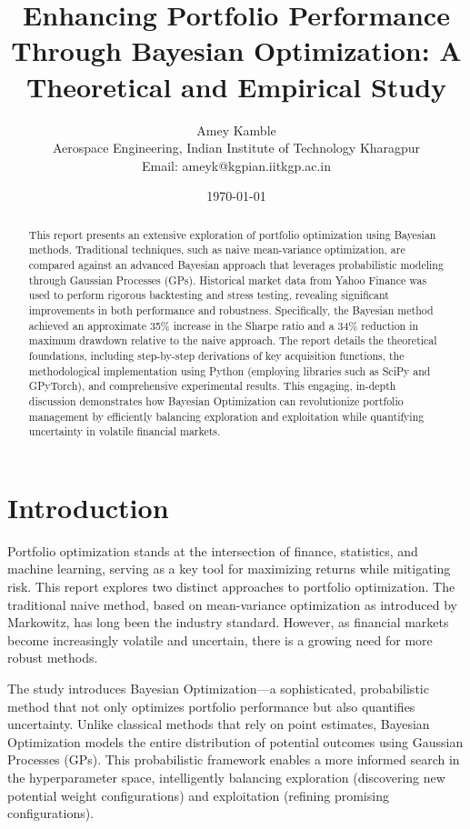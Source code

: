 \documentclass[a4paper,12pt]{article}
\title{\textbf{Enhancing Portfolio Performance Through Bayesian Optimization: A Theoretical and Empirical Study}}
\author{Amey Kamble  \\ Aerospace Engineering, Indian Institute of Technology Kharagpur\\ Email: ameyk@kgpian.iitkgp.ac.in}
\date{\today}
\begin{document}
\maketitle

\begin{abstract}
This report presents an extensive exploration of portfolio optimization using Bayesian methods. Traditional techniques, such as naive mean-variance optimization, are compared against an advanced Bayesian approach that leverages probabilistic modeling through Gaussian Processes (GPs). Historical market data from Yahoo Finance was used to perform rigorous backtesting and stress testing, revealing significant improvements in both performance and robustness. Specifically, the Bayesian method achieved an approximate 35\% increase in the Sharpe ratio and a 34\% reduction in maximum drawdown relative to the naive approach. The report details the theoretical foundations, including step-by-step derivations of key acquisition functions, the methodological implementation using Python (employing libraries such as SciPy and GPyTorch), and comprehensive experimental results. This engaging, in-depth discussion demonstrates how Bayesian Optimization can revolutionize portfolio management by efficiently balancing exploration and exploitation while quantifying uncertainty in volatile financial markets.
\end{abstract}

\newpage

\tableofcontents

\newpage

\section{Introduction}
Portfolio optimization stands at the intersection of finance, statistics, and machine learning, serving as a key tool for maximizing returns while mitigating risk. This report explores two distinct approaches to portfolio optimization. The traditional naive method, based on mean-variance optimization as introduced by Markowitz, has long been the industry standard. However, as financial markets become increasingly volatile and uncertain, there is a growing need for more robust methods.

The study introduces Bayesian Optimization---a sophisticated, probabilistic method that not only optimizes portfolio performance but also quantifies uncertainty. Unlike classical methods that rely on point estimates, Bayesian Optimization models the entire distribution of potential outcomes using Gaussian Processes (GPs). This probabilistic framework enables a more informed search in the hyperparameter space, intelligently balancing exploration (discovering new potential weight configurations) and exploitation (refining promising configurations).
\end{document}
